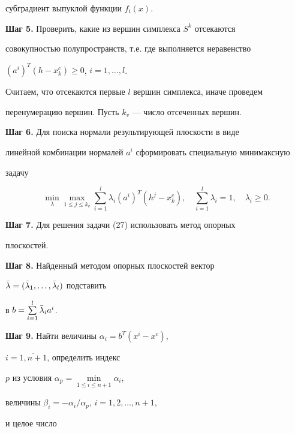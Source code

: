 субградиент выпуклой функции $f_i(x)$.





{\bf Шаг 5.} Проверить, какие из вершин симплекса $S^k$ отсекаются


совокупностью полупространств, т.е. где выполняется неравенство


$(a^i)^T(h-x^c_k)\ge 0$, $i=1,\dotsc,l$.


Считаем, что отсекаются первые $l$ вершин симплекса, иначе проведем


перенумерацию вершин. Пусть $k_v$ --- число отсеченных вершин.





{\bf Шаг 6.} Для поиска нормали результирующей плоскости в виде


линейной комбинации нормалей $a^i$ сформировать специальную минимаксную


задачу


\begin{equation}


\min_\lambda\max_{1\le j\le k_v}\sum^l_{i=1}\lambda_i


(a^i)^T(h^j-x^c_k),\quad \sum^l_{i=1}\lambda_i=1,\quad


\lambda_i\ge 0.


\end{equation}





{\bf Шаг 7.} Для решения задачи (27) использовать метод опорных


плоскостей.





{\bf Шаг 8.} Найденный методом опорных плоскостей вектор


$\Bar\lambda=(\Bar\lambda_1,\dotsc,\Bar\lambda_l)$ подставить


в $b=\sum\limits^l_{i=1}\Bar\lambda_ia^i$.





{\bf Шаг 9.} Найти величины $\alpha_i=b^T(x^i-x^c)$,


$i=\overline{1,n+1}$, определить индекс


$p$ из условия $\alpha_p=\min\limits_{1\le i\le n+1}\alpha_i$,


величины $\beta_i=-\alpha_i/\alpha_p$, $i=1,2,\dotsc,n+1$,


и целое число


